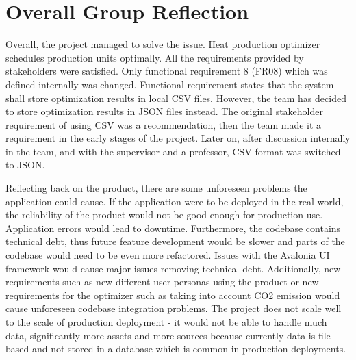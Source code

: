 \section{Overall Group Reflection}
Overall, the project managed to solve the issue. Heat production optimizer schedules production units optimally. All the requirements provided by stakeholders were satisfied. Only functional requirement 8 (FR08) which was defined internally was changed. Functional requirement states that the system shall store optimization results in local CSV files. However, the team has decided to store optimization results in JSON files instead. The original stakeholder requirement of using CSV was a recommendation, then the team made it a requirement in the early stages of the project. Later on, after discussion internally in the team, and with the supervisor and a professor, CSV format was switched to JSON.\par
Reflecting back on the product, there are some unforeseen problems the application could cause. If the application were to be deployed in the real world, the reliability of the product would not be good enough for production use. Application errors would lead to downtime. Furthermore, the codebase contains technical debt, thus future feature development would be slower and parts of the codebase would need to be even more refactored. Issues with the Avalonia UI framework would cause major issues removing technical debt. Additionally, new requirements such as new different user personas using the product or new requirements for the optimizer such as taking into account CO2 emission would cause unforeseen codebase integration problems. The project does not scale well to the scale of production deployment - it would not be able to handle much data, significantly more assets and more sources because currently data is file-based and not stored in a database which is common in production deployments.\par
